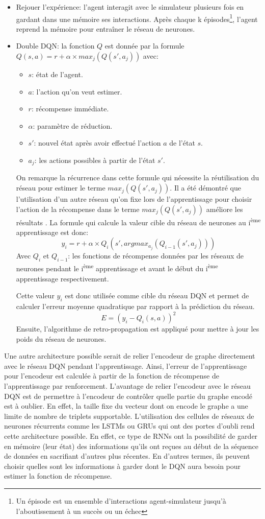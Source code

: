 \begin{itemize}
	\item Rejouer l'expérience: l'agent interagit avec le simulateur plusieurs fois en gardant dans une mémoire ses interactions. Après chaque k épisodes\footnote{Un épisode est un ensemble d'interactions agent-simulateur jusqu'à l'aboutissement à un succès ou un échec}, l'agent reprend la mémoire pour entraîner le réseau de neurones.
	\item Double DQN: la fonction $Q$ est donnée par la formule $Q(s,a) = r + \alpha \times max_j(Q(s',a_j))$ \citep{Mnih2015} avec:
	\begin{itemize}
		\item $s$: état de l'agent.
		\item $a$: l'action qu'on veut estimer.
		\item $r$: récompense immédiate.
		\item $\alpha$: paramètre de réduction.
		\item $s'$: nouvel état après avoir effectué l'action $a$ de l'état $s$.
		\item $a_j$: les actions possibles à partir de l'état $s'$.
	\end{itemize}
	On remarque la récurrence dans cette formule qui nécessite la réutilisation du réseau pour estimer le terme $max_j (Q(s',a_j))$. Il a été démontré que l'utilisation d'un autre réseau qu'on fixe lors de l'apprentissage pour choisir l'action de la récompense dans le terme $max_j (Q(s',a_j))$ améliore les résultats \citep{Mnih2015}. La formule qui calcule la valeur cible du réseau de neurones au i\textsuperscript{ème} apprentissage est donc: 
	\[y_i = r + \alpha \times Q_i(s',argmax_{a_j}(Q_{i-1}(s',a_j)))\]
	Avec $Q_i$ et $Q_{i-1}$: les fonctions de récompense données par les réseaux de neurones pendant le i\textsuperscript{ème} apprentissage et avant le début du i\textsuperscript{ème} apprentissage respectivement.
	\par Cette valeur $y_i$ est donc utilisée comme cible du réseau DQN et permet de calculer l'erreur moyenne quadratique par rapport à la prédiction du réseau.
	 \[E = (y_i - Q_i(s,a))^2\]
	 Ensuite, l'algorithme de retro-propagation est appliqué pour mettre à jour les poids du réseau de neurones.
\end{itemize}
Une autre architecture possible serait de relier l'encodeur de graphe directement avec le réseau DQN pendant l'apprentissage. Ainsi, l'erreur de l'apprentissage pour l'encodeur est calculée à partir de la fonction de récompense de l'apprentissage par renforcement. L'avantage de relier l'encodeur avec le réseau DQN est de permettre à l'encodeur de contrôler quelle partie du graphe encodé est à oublier. En effet, la taille fixe du vecteur dont on encode le graphe a une limite de nombre de triplets supportable. L'utilisation des cellules de réseaux de neurones récurrents comme les LSTMs ou GRUs qui ont des portes d'oubli rend cette architecture possible. En effet, ce type de RNNs ont la possibilité de garder en mémoire (leur état) des informations qu'ils ont reçues au début de la séquence de données en sacrifiant d'autres plus récentes. En d'autres termes, ils peuvent choisir quelles sont les informations à garder dont le DQN aura besoin pour estimer la fonction de récompense.
